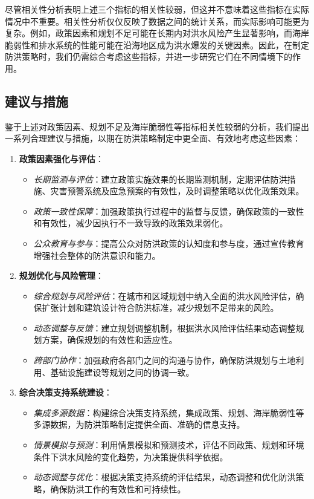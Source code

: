 \documentclass[withoutpreface,bwprint]{cumcmthesis} %
\begin{document}
尽管相关性分析表明上述三个指标的相关性较弱，但这并不意味着这些指标在实际情况中不重要。相关性分析仅仅反映了数据之间的统计关系，而实际影响可能更为复杂。例如，政策因素和规划不足可能在长期内对洪水风险产生显著影响，而海岸脆弱性和排水系统的性能可能在沿海地区成为洪水爆发的关键因素。因此，在制定防洪策略时，我们仍需综合考虑这些指标，并进一步研究它们在不同情境下的作用。


\subsection{建议与措施}

鉴于上述对政策因素、规划不足及海岸脆弱性等指标相关性较弱的分析，我们提出一系列合理建议与措施，以期在防洪策略制定中更全面、有效地考虑这些因素：

\begin{enumerate}
	\item \textbf{政策因素强化与评估}：
	\begin{itemize}
		\item \emph{长期监测与评估}：建立政策实施效果的长期监测机制，定期评估防洪措施、灾害预警系统及应急预案的有效性，及时调整策略以优化政策效果。
		\item \emph{政策一致性保障}：加强政策执行过程中的监督与反馈，确保政策的一致性和有效性，减少因执行不一致导致的政策效果弱化。
		\item \emph{公众教育与参与}：提高公众对防洪政策的认知度和参与度，通过宣传教育增强社会整体的防洪意识和能力。
	\end{itemize}
	
	\item \textbf{规划优化与风险管理}：  
	\begin{itemize}  
		\item \emph{综合规划与风险评估}：在城市和区域规划中纳入全面的洪水风险评估，确保扩张计划和建筑设计符合防洪标准，减少规划不足带来的风险。  
		\item \emph{动态调整与反馈}：建立规划调整机制，根据洪水风险评估结果动态调整规划方案，确保规划的有效性和适应性。  
		\item \emph{跨部门协作}：加强政府各部门之间的沟通与协作，确保防洪规划与土地利用、基础设施建设等规划之间的协调一致。  
	\end{itemize}  
	
	\item \textbf{综合决策支持系统建设}：  
	\begin{itemize}  
		\item \emph{集成多源数据}：构建综合决策支持系统，集成政策、规划、海岸脆弱性等多源数据，为防洪策略制定提供全面、准确的信息支持。  
		\item \emph{情景模拟与预测}：利用情景模拟和预测技术，评估不同政策、规划和环境条件下洪水风险的变化趋势，为决策提供科学依据。  
		\item \emph{动态调整与优化}：根据决策支持系统的评估结果，动态调整和优化防洪策略，确保防洪工作的有效性和可持续性。  
	\end{itemize}
\end{enumerate}
\end{document}
